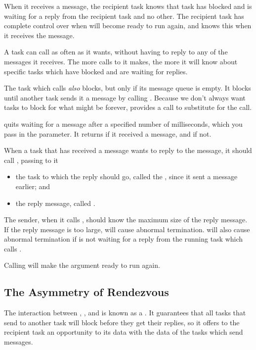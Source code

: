 When it receives a message, the recipient task knows that task 
has blocked and is waiting for a reply from the recipient task and no other.
The recipient task has complete control over when  will become
ready to run again, and knows this when it receives the message.

A task can call  as often as it wants, without having to
reply to any of the messages it receives.  The more calls to 
it makes, the more it will know about specific tasks which have blocked
and are waiting for replies.

The task which calls  {\em also\/} blocks, but only if its
message queue is empty.  It blocks until another task sends it a message
by calling .  Because we don't always want tasks to block for
what might be forever,  provides a 
call to substitute for the  call.

 quits waiting for a message after a specified number of
milliseconds, which you pass in the  parameter.  It
returns  if it received a message, and  if not.

When a task that has received a message wants to reply to the message,
it should call , passing to it
\begin{itemize}
\item
 the task to which the reply should go, called the , since
 it sent a message earlier; and
\item
 the reply message, called .
\end{itemize}

The sender, when it calls , should know the maximum size of
the reply message.  If the reply message is too large,
 will cause abnormal termination.   will also
cause abnormal termination if  is not waiting for a reply
from the running task which calls .

Calling  will make the  argument ready to run
again.

\subsection{The Asymmetry of Rendezvous}

The interaction between , , and 
is known as a .  It guarantees that all tasks that
send to another task will block before they get their replies, so it
offers to the recipient task an opportunity to 
its data with the data of the tasks which send messages.

